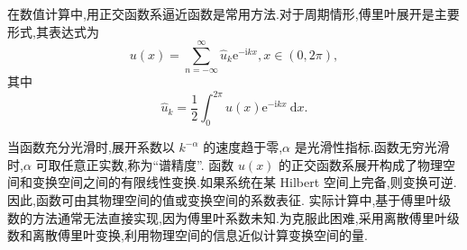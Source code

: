 


在数值计算中,用正交函数系逼近函数是常用方法.对于周期情形,傅里叶展开是主要形式,其表达式为
\begin{equation}
u(x)=\sum_{n=-\infty}^{\infty} \hat{u}_k \mathrm{e}^{-\mathrm{i} k x}, x \in(0,2 \pi),
\end{equation}
其中
\begin{equation}
\widehat{u}_k=\frac{1}{2} \int_0^{2 \pi} u(x) \mathrm{e}^{-\mathrm{i} k x} \mathrm{~d} x.
\end{equation}

当函数充分光滑时,展开系数以 $k^{-\alpha}$ 的速度趋于零,$\alpha$ 是光滑性指标.函数无穷光滑时,$\alpha$ 可取任意正实数,称为“谱精度”.
函数 $u(x)$ 的正交函数系展开构成了物理空间和变换空间之间的有限线性变换.如果系统在某 Hilbert 空间上完备,则变换可逆.因此,函数可由其物理空间的值或变换空间的系数表征.
实际计算中,基于傅里叶级数的方法通常无法直接实现,因为傅里叶系数未知.为克服此困难,采用离散傅里叶级数和离散傅里叶变换,利用物理空间的信息近似计算变换空间的量.

